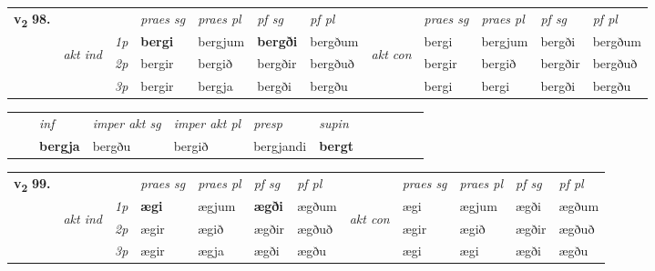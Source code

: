 \begin{tabular}{llllllllllll} \toprule
\multirow{4}{*}{{{\textbf{v{\textsubscript{2}}} \Large{\textbf{98.}}}}}  & &   &  \textit{praes sg}  & \textit{praes pl}  &\textit{ pf sg} & \textit{pf pl} &  &  \textit{praes sg}  & \textit{praes pl}  & \textit{pf sg} & \textit{pf pl } \\*
	\cmidrule{4-7} \cmidrule{9-12}
 & \multirow{3}{*}{\begin{turn}{90}\textit{akt ind}\end{turn}} & {\textit{1p}} & \textbf{bergi} & bergjum    & \textbf{bergði} & bergðum & \multirow{3}{*}{\begin{turn}{90}\textit{akt con}\end{turn}} &bergi & bergjum & bergði & bergðum\\*
& &  {\textit{2p}} &  bergir  & bergið   & bergðir & bergðuð & & bergir & bergið & bergðir & bergðuð \\*
& &  {\textit{3p}} & bergir & bergja   & bergði & bergðu & & bergi & bergi& bergði & bergðu  \\*
\cmidrule{4-7} \cmidrule{9-12}
\end{tabular}


\begin{tabular}{llllllllllll}
 & & \textit{inf} & \textit{imper akt sg} & \textit{imper akt pl}   & \textit{presp} & \textit{supin}       \\*
  & & \textbf{bergja} & bergðu  & bergið   & bergjandi &  \textbf{bergt}   \\*
\cmidrule{1-12}
\end{tabular}



\begin{tabular}{llllllllllll} \toprule
\multirow{4}{*}{{{\textbf{v{\textsubscript{2}}} \Large{\textbf{99.}}}}}  & &   &  \textit{praes sg}  & \textit{praes pl}  &\textit{ pf sg} & \textit{pf pl} &  &  \textit{praes sg}  & \textit{praes pl}  & \textit{pf sg} & \textit{pf pl } \\*
	\cmidrule{4-7} \cmidrule{9-12}
 & \multirow{3}{*}{\begin{turn}{90}\textit{akt ind}\end{turn}} & {\textit{1p}} & \textbf{ægi} & ægjum    & \textbf{ægði} & ægðum & \multirow{3}{*}{\begin{turn}{90}\textit{akt con}\end{turn}} &ægi & ægjum & ægði & ægðum\\*
& &  {\textit{2p}} &  ægir  & ægið   & ægðir & ægðuð & & ægir & ægið & ægðir & ægðuð \\*
& &  {\textit{3p}} & ægir & ægja   & ægði & ægðu & & ægi & ægi& ægði & ægðu  \\*
\cmidrule{4-7} \cmidrule{9-12}
\end{tabular}



